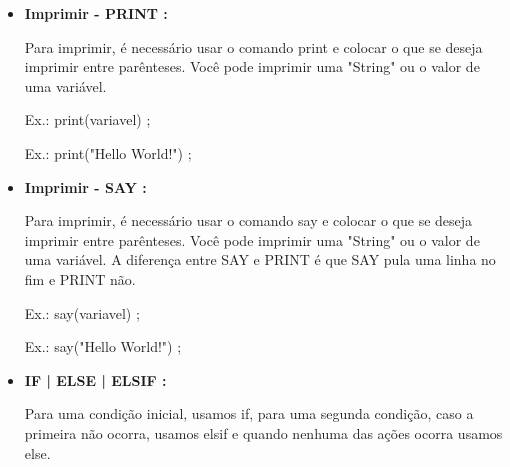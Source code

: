 \documentclass[a4paper]{article}
\begin{document}
{{{{{{{{\begin{itemize}
            Quando queremos atribuir algum valor a
            determinada variável, basta fazer usar 
            \textcolor{NavyBlue}{=}.
            Também pode-se atribuir um valor a uma
            variável em sua declaração.
            
            \textcolor{NavyBlue}{Ex.:}
            variável 
            \textcolor{NavyBlue}{=}
            42;
            
        \bigskip
        
        \item \textbf{Imprimir - PRINT : }
        
            Para imprimir, é necessário usar o
            comando 
            \textcolor{NavyBlue}{print} e
            colocar o que se deseja imprimir entre
            parênteses.
            Você pode imprimir uma "String" ou o 
            valor de uma variável.
            
            \textcolor{NavyBlue}{Ex.:}
            \textcolor{NavyBlue}{print(variavel)}
            ;
            
            \textcolor{NavyBlue}{Ex.:}
            \textcolor{NavyBlue}{print("Hello World!")}
            ;
       
       \bigskip
            
       \item \textbf{Imprimir - SAY : }
        
            Para imprimir, é necessário usar o
            comando 
            \textcolor{NavyBlue}{say} e
            colocar o que se deseja imprimir entre
            parênteses.
            Você pode imprimir uma "String" ou o 
            valor de uma variável.
            A diferença entre SAY e PRINT é que
            SAY pula uma linha no fim e PRINT não.
            
            \textcolor{NavyBlue}{Ex.:}
            \textcolor{NavyBlue}{say(variavel)}
            ;
            
            \textcolor{NavyBlue}{Ex.:}
            \textcolor{NavyBlue}{say("Hello World!")}
            ;
        
            
\newpage %
            
            
        \item \textbf{IF | ELSE | ELSIF : }
            
            Para uma condição inicial, usamos
            \textcolor{NavyBlue}{if},
            para uma segunda condição, caso a 
            primeira não ocorra, usamos
            \textcolor{NavyBlue}{elsif}
            e quando nenhuma das ações ocorra
            usamos 
            \textcolor{NavyBlue}{else}.
            

\end{itemize}}}}}}}}}
\end{document}
